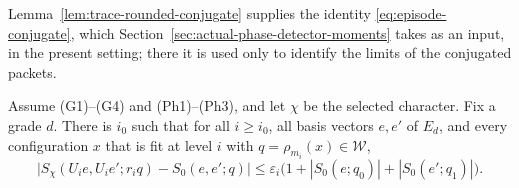 Lemma~\ref{lem:trace-rounded-conjugate} supplies the identity
\eqref{eq:episode-conjugate}, which
Section~\ref{sec:actual-phase-detector-moments} takes as an input, in
the present setting; there it is used only to identify the limits of the
conjugated packets.

\begin{proposition}
\label{prop:trace-rounded-comparison}
Assume (G1)--(G4) and (Ph1)--(Ph3), and let $\chi$ be the selected
character. Fix a grade $d$. There is $i_0$ such that for all $i\ge i_0$,
all basis vectors $e,e'$ of $E_d$, and every configuration $x$ that is fit
at level $i$ with $q=\rho_{m_i}(x)\in\mathcal W$,
\begin{equation}\label{eq:trace-rounded-comparison}
 \bigl|S_\chi(U_ie,U_ie';r_iq)-S_0(e,e';q)\bigr|
 \le\varepsilon_i\bigl(1+|S_0(e;q_0)|+|S_0(e';q_1)|\bigr).
\end{equation}
\end{proposition}
